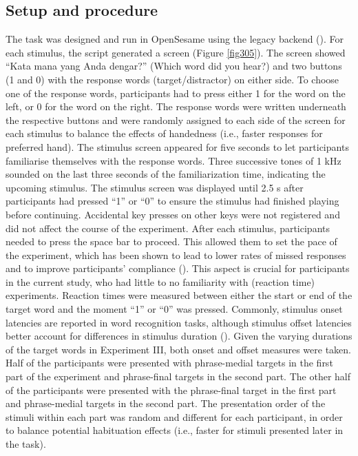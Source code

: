 \subsection{Setup and procedure}
\largerpage
The task was designed and run in OpenSesame using the legacy backend (\citealt{mathot_opensesame_2012}). For each stimulus, the script generated a screen (Figure \ref{fig305}). The screen showed ``Kata mana yang Anda dengar?'' (Which word did you hear?) and two buttons (1 and 0) with the response words (target/distractor) on either side. To choose one of the response words, participants had to press either 1 for the word on the left, or 0 for the word on the right. The response words were written underneath the respective buttons and were randomly assigned to each side of the screen for each stimulus to balance the effects of handedness (i.e., faster responses for preferred hand). The stimulus screen appeared for five seconds to let participants familiarise themselves with the response words. Three successive tones of 1 kHz sounded on the last three seconds of the familiarization time, indicating the upcoming stimulus. The stimulus screen was displayed until 2.5 s after participants had pressed ``1'' or ``0'' to ensure the stimulus had finished playing before continuing. Accidental key presses on other keys were not registered and did not affect the course of the experiment. After each stimulus, participants needed to press the space bar to proceed. This allowed them to set the pace of the experiment, which has been shown to lead to lower rates of missed responses and to improve participants' compliance (\citealt{krinzinger_sensitivity_2011}). This aspect is crucial for participants in the current study, who had little to no familiarity with (reaction time) experiments. Reaction times were measured between either the start or end of the target word and the moment ``1'' or ``0'' was pressed. Commonly, stimulus onset latencies are reported in word recognition tasks, although stimulus offset latencies better account for differences in stimulus duration (\citealt{lipinski_does_2005}). Given the varying durations of the target words in Experiment III, both onset and offset measures were taken. Half of the participants were presented with phrase-medial targets in the first part of the experiment and phrase-final targets in the second part. The other half of the participants were presented with the phrase-final target in the first part and phrase-medial targets in the second part. The presentation order of the stimuli within each part was random and different for each participant, in order to balance potential habituation effects (i.e., faster for stimuli presented later in the task).

